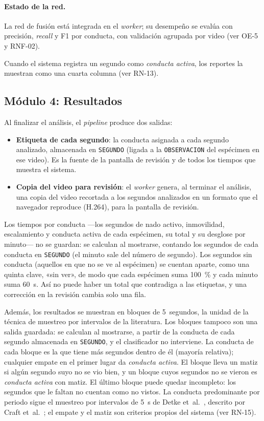 \paragraph{Estado de la red.} La red de fusión está integrada en el \textit{worker}; su desempeño
se evalúa con precisión, \textit{recall} y F1 por conducta, con validación agrupada por video (ver OE-5 y RNF-02).

Cuando el sistema registra un segundo como \textit{conducta activa}, los reportes
la muestran como una cuarta columna (ver RN-13).

\subsection{Módulo 4: Resultados}

Al finalizar el análisis, el \textit{pipeline} produce dos salidas:

\begin{itemize}
  \item \textbf{Etiqueta de cada segundo}: la conducta asignada a cada segundo
        analizado, almacenada en \texttt{SEGUNDO} (ligada a la
        \texttt{OBSERVACION} del espécimen en ese video). Es la fuente de la pantalla
        de revisión y de todos los tiempos que muestra el sistema.
  \item \textbf{Copia del video para revisión}: el \textit{worker} genera, al
        terminar el análisis, una copia del video recortada a los segundos analizados
        en un formato que el navegador reproduce (H.264), para la pantalla de revisión.
\end{itemize}

Los tiempos por conducta ---los segundos de nado activo, inmovilidad, escalamiento y
conducta activa de cada espécimen, su total y su desglose por minuto--- no se guardan:
se calculan al mostrarse, contando los segundos de cada conducta en \texttt{SEGUNDO}
(el minuto sale del número de segundo). Los segundos sin conducta (aquellos en que no se
ve al espécimen) se cuentan aparte, como una quinta clave, «sin ver», de modo que cada
espécimen suma 100~\% y cada minuto suma 60~s. Así no puede haber un total que contradiga a
las etiquetas, y una corrección en la revisión cambia solo una fila.

Además, los resultados se muestran en bloques de 5~segundos, la unidad de la técnica de
muestreo por intervalos de la literatura. Los bloques tampoco son una salida guardada: se calculan al mostrarse, a
partir de la conducta de cada segundo almacenada en \texttt{SEGUNDO}, y el clasificador
no interviene. La conducta de cada bloque es la que tiene más segundos dentro de él
(mayoría relativa); cualquier empate en el primer lugar da \textit{conducta activa}. El
bloque lleva un matiz si algún segundo suyo no se vio bien, y un bloque cuyos segundos
no se vieron es \textit{conducta activa} con matiz. El último bloque puede quedar
incompleto: los segundos que le faltan no cuentan como no vistos. La conducta predominante
por periodo sigue el muestreo por intervalos de 5~s de Detke et~al.\ \cite{detke1995},
descrito por Craft et~al.\ \cite{craft2010}; el empate y el matiz son criterios propios
del sistema (ver RN-15).

